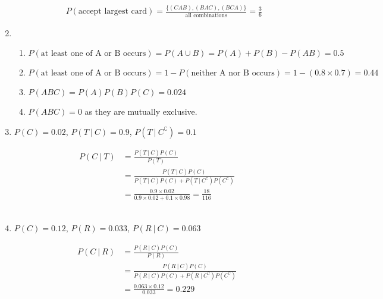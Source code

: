 \begin{enumerate}
\begin{enumerate}
			\begin{align}
				P(\text{accept largest card}) = \frac{\{(CAB), (BAC), (BCA)\}}{\text{all combinations}} = \frac{3}{6}
			\end{align}
		
	\end{enumerate}
	
	\item \begin{enumerate}
		\item $ P(\text{at least one of A or B occurs}) = P(A \cup B) = P(A) + P(B) - P(AB) = 0.5$\\
		
		\item $ P(\text{at least one of A or B occurs}) = 1 - P(\text{neither A nor B occurs}) = 1 - (0.8 \times 0.7) = 0.44$ \\
		
		\item $ P(ABC) = P(A) P(B) P(C) = 0.024 $\\
		
		\item $ P(ABC) = 0 $ as they are mutually exclusive.\\
		
	\end{enumerate}
	
	\item $ P(C) = 0.02 $, $ P(T\ |\ C) = 0.9 $, $ P(T\ |\ C^\complement) = 0.1 $
	
	\begin{align}
		P(C\ |\ T) &= \frac{P(T\ |\ C)P(C)}{P(T)} \\
		&= \frac{P(T\ |\ C)P(C)}{P(T\ |\ C)P(C) + P(T\ |\ C^\complement)P(C^\complement)} \\
		&= \frac{0.9 \times 0.02}{0.9 \times 0.02 + 0.1 \times 0.98} = \frac{18}{116}
	\end{align} \\
	
	\item $ P(C) = 0.12 $, $ P(R) = 0.033 $, $ P(R\ |\ C) = 0.063 $
	
	\begin{align}
		P(C\ |\ R) &= \frac{P(R\ |\ C)P(C)}{P(R)} \\
		&= \frac{P(R\ |\ C)P(C)}{P(R\ |\ C)P(C) + P(R\ |\ C^\complement)P(C^\complement)} \\
		&= \frac{0.063 \times 0.12}{0.033} = 0.229
	\end{align} \\ 
	

\end{enumerate}
